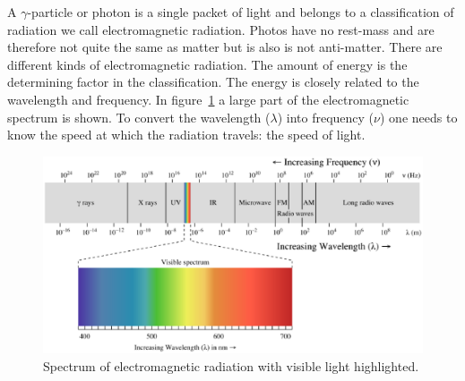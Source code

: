 \documentclass[12pt,a4paper]{article}
\numberwithin{equation}{section}
\numberwithin{figure}{section}
\numberwithin{table}{section}
\begin{document}
A $\gamma$-particle or photon is a single packet of light and belongs to a classification of radiation we call electromagnetic radiation. Photos have no rest-mass and are therefore not quite the same as matter but is also is not anti-matter. There are different kinds of electromagnetic radiation. The amount of energy is the determining factor in the classification. The energy is closely related to the wavelength and frequency. In figure~\ref{fig:em_spec} a large part of the electromagnetic spectrum is shown. To convert the wavelength ($\lambda$) into frequency ($\nu$) one needs to know the speed at which the radiation travels: the speed of light.
\begin{figure}\begin{center}
\includegraphics[scale=0.7]{EM_spectrum.svg.eps}%
\caption{Spectrum of electromagnetic radiation with visible light highlighted.}\label{fig:em_spec}
\end{center}\end{figure}
\end{document}
